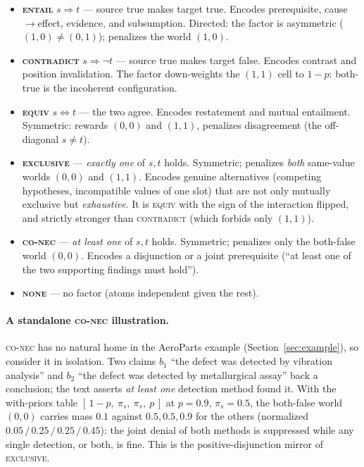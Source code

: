 \documentclass[11pt]{article}
\begin{document}
\begin{itemize}[leftmargin=*]
  \item \textbf{\textsc{entail}} $s\!\Rightarrow\!t$ --- source true makes target true.
        Encodes prerequisite, cause$\to$effect, evidence, and subsumption. Directed:
        the factor is asymmetric ($(1,0)\neq(0,1)$); penalizes the world $(1,0)$.
  \item \textbf{\textsc{contradict}} $s\!\Rightarrow\!\neg t$ --- source true makes target
        false. Encodes contrast and position invalidation. The factor down-weights the
        $(1,1)$ cell to $1-p$: both-true is the incoherent configuration.
  \item \textbf{\textsc{equiv}} $s\!\Leftrightarrow\!t$ --- the two agree. Encodes
        restatement and mutual entailment. Symmetric: rewards $(0,0)$ and $(1,1)$, penalizes
        disagreement (the off-diagonal $s\neq t$).
  \item \textbf{\textsc{exclusive}} --- \emph{exactly one} of $s,t$ holds. Symmetric;
        penalizes \emph{both} same-value worlds $(0,0)$ and $(1,1)$. Encodes genuine
        alternatives (competing hypotheses, incompatible values of one slot) that are not
        only mutually exclusive but \emph{exhaustive}. It is \textsc{equiv} with the sign of
        the interaction flipped, and strictly stronger than \textsc{contradict} (which forbids
        only $(1,1)$).
  \item \textbf{\textsc{co-nec}} --- \emph{at least one} of $s,t$ holds. Symmetric; penalizes
        only the both-false world $(0,0)$. Encodes a disjunction or a joint prerequisite
        (``at least one of the two supporting findings must hold'').
  \item \textbf{\textsc{none}} --- no factor (atoms independent given the rest).
\end{itemize}

\paragraph{A standalone \textsc{co-nec} illustration.} \textsc{co-nec} has no natural home in
the AeroParts example (Section~\ref{sec:example}), so consider it in isolation. Two claims
$b_1$ ``the defect was detected by vibration analysis'' and $b_2$ ``the defect was detected by
metallurgical assay'' back a conclusion; the text asserts \emph{at least one} detection method
found it. With the with-priors table $[\,1{-}p,\ \pi_s,\ \pi_s,\ p\,]$ at $p{=}0.9$,
$\pi_s{=}0.5$, the both-false world $(0,0)$ carries mass $0.1$ against $0.5,0.5,0.9$ for the
others (normalized $0.05\,/\,0.25\,/\,0.25\,/\,0.45$): the joint denial of both methods is
suppressed while any single detection, or both, is fine. This is the positive-disjunction
mirror of \textsc{exclusive}.
\end{document}
